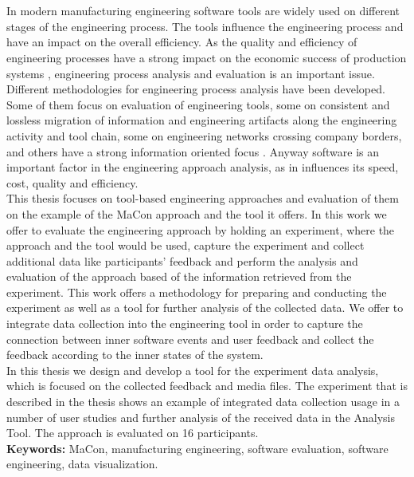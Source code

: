 \chapter{\abstractname}

In modern manufacturing engineering software tools are widely used on different stages of the engineering process. The tools influence the engineering process and have an impact on the overall efficiency. As the quality and efficiency of engineering processes have a strong impact on the economic success of production systems \cite{eval}, engineering process analysis and evaluation is an important issue. Different methodologies for engineering process analysis have been developed. Some of them focus on evaluation of engineering tools, some on consistent and lossless migration of information and engineering artifacts along the engineering activity and tool chain, some on engineering networks crossing company borders, and others have a strong information oriented focus \cite{eval}. Anyway software is an important factor in the engineering approach analysis, as in influences its speed, cost, quality and efficiency.\\ 

This thesis focuses on tool-based engineering approaches and evaluation of them on the example of the MaCon approach and the tool it offers. In this work we offer to evaluate the engineering approach by holding an experiment, where the approach and the tool would be used, capture the experiment and collect additional data like participants' feedback and perform the analysis and evaluation of the approach based of the information retrieved from the experiment. This work offers a methodology for preparing and conducting the experiment as well as a tool for further analysis of the collected data. We offer to integrate data collection into the engineering tool in order to capture the connection between inner software events and user feedback and collect the feedback according to the inner states of the system.\\

In this thesis we design and develop a tool for the experiment data analysis, which is focused on the collected feedback and media files.  The experiment that is described in the thesis shows an example of integrated data collection usage in a number of user studies and further analysis of the received data in the Analysis Tool. The approach is evaluated on 16 participants.\\

\textbf{Keywords:} MaCon, manufacturing engineering, software evaluation, software engineering, data visualization.


